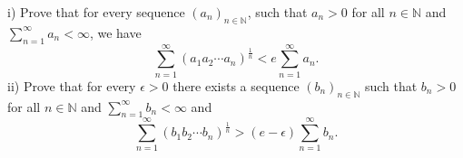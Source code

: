 i) Prove that for every sequence $(a_{n})_{n\in \mathbb{N}}$, such that $a_{n}>0$ for all $n \in \mathbb{N}$ and
$\sum_{n=1}^{\infty}a_{n}<\infty$, we have
$$\sum_{n=1}^{\infty}(a_{1}a_{2} \cdots a_{n})^{\frac{1}{n}}< e\sum_{n=1}^{\infty}a_{n}.$$ii) Prove that for every $\epsilon>0$ there exists a sequence $(b_{n})_{n\in \mathbb{N}}$ such that $b_{n}>0$ for all $n \in \mathbb{N}$ and
$\sum_{n=1}^{\infty}b_{n}<\infty$ and
$$\sum_{n=1}^{\infty}(b_{1}b_{2} \cdots b_{n})^{\frac{1}{n}}> (e-\epsilon)\sum_{n=1}^{\infty}b_{n}.$$